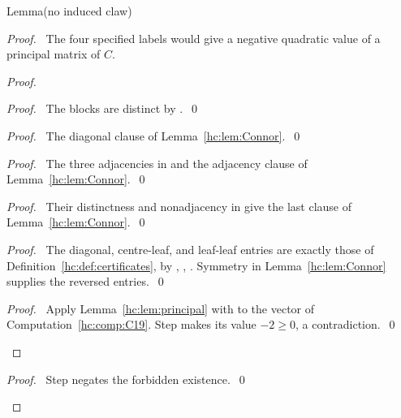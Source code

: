 \begin{mergedproofsection}
\begin{namedresult}{Lemma}{(no induced claw)}\label{hc:lem:claw}
 \leavevmode\par
\end{namedresult}
\begin{proof}
 \pfsketch\ The four specified labels would give a negative
 quadratic value of a principal matrix of $C$.
 \begin{proof}
  \begin{proof}\pf\ The blocks are distinct by .~\qed\end{proof}
  \begin{proof}\pf\ The diagonal clause of Lemma~\ref{hc:lem:Connor}.~\qed\end{proof}
  \begin{proof}\pf\ The three adjacencies in  and the
   adjacency clause of Lemma~\ref{hc:lem:Connor}.~\qed\end{proof}
  \begin{proof}\pf\ Their distinctness and nonadjacency in 
   give the last clause of Lemma~\ref{hc:lem:Connor}.~\qed\end{proof}
  \begin{proof}\pf\ The diagonal, centre-leaf, and leaf-leaf entries
   are exactly those of Definition~\ref{hc:def:certificates}, by
   , , .
   Symmetry in Lemma~\ref{hc:lem:Connor} supplies the reversed entries.~\qed\end{proof}
  \qedstep
  \begin{proof}\pf\ Apply Lemma~\ref{hc:lem:principal} with
    to the vector of Computation~\ref{hc:comp:C19}.
   Step  makes its value $-2\ge0$, a contradiction.~\qed\end{proof}
 \end{proof}
 \qedstep
 \begin{proof}\pf\ Step  negates the forbidden existence.~\qed\end{proof}
\end{proof}


\end{mergedproofsection}
